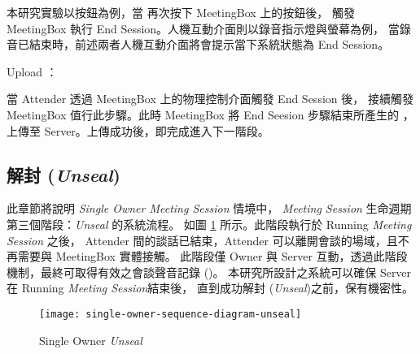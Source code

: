 \begin{steps}
            本研究實驗以按鈕為例，當 \DEFattender 再次按下 MeetingBox 上的按鈕後，
        觸發 MeetingBox 執行 End Session。人機互動介面則以錄音指示燈與螢幕為例，
        當錄音已結束時，前述兩者人機互動介面將會提示當下系統狀態為 End Session。

    \item Upload \DEFrecJ：

            當 Attender 透過 MeetingBox 上的物理控制介面觸發 End Session 後，
        接續觸發 MeetingBox 值行此步驟。此時 MeetingBox 將 End Seesion 步驟結束所產生的 \DEFrecJ，
        上傳至 Server。上傳成功後，即完成進入下一階段。
\end{steps}


\subsection{解封 ({\it Unseal})}
\label{subsec.unseal}

    此章節將說明 {\it Single Owner Meeting Session} 情境中，
{\it Meeting Session} 生命週期第三個階段：{\it Unseal} 的系統流程。
如圖 \ref{fig.s-o-unseal} 所示。此階段執行於 Running {\it Meeting Session} 之後，
Attender 間的談話已結束，Attender 可以離開會談的場域，且不再需要與 MeetingBox 實體接觸。
此階段僅 Owner 與 Server 互動，透過此階段機制，最終可取得有效之會談聲音記錄 (\DEFrecREV)。
本研究所設計之系統可以確保 Server 在 Running {\it Meeting Session}結束後，
直到成功解封 ({\it Unseal})之前，\DEFrecREV 保有機密性。

\begin{figure}[H]
    \centering
    \texttt{[image: single-owner-sequence-diagram-unseal]}
    \caption{Single Owner {\it Unseal}}
    \label{fig.s-o-unseal}
\end{figure}

